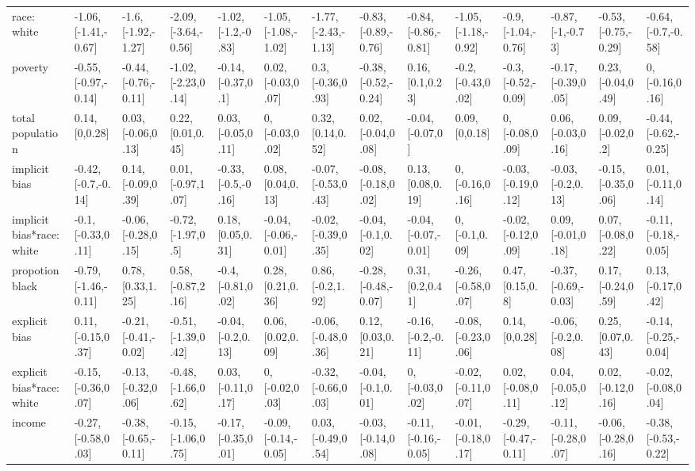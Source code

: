\documentclass[english,floatsintext,man]{apa6}
\newenvironment{lltable}
  {\begin{landscape}\begin{center}\begin{ThreePartTable}}
  {\end{ThreePartTable}\end{center}\end{landscape}}
\theoremstyle{definition}
\theoremstyle{definition}
\theoremstyle{remark}
\begin{document}
\begin{lltable}
{\begin{longtable}{llllllllllllll}
race: white & -1.06, [-1.41,-0.67] & -1.6, [-1.92,-1.27] & -2.09, [-3.64,-0.56] & -1.02, [-1.2,-0.83] & -1.05, [-1.08,-1.02] & -1.77, [-2.43,-1.13] & -0.83, [-0.89,-0.76] & -0.84, [-0.86,-0.81] & -1.05, [-1.18,-0.92] & -0.9, [-1.04,-0.76] & -0.87, [-1,-0.73] & -0.53, [-0.75,-0.29] & -0.64, [-0.7,-0.58]\\
poverty & -0.55, [-0.97,-0.14] & -0.44, [-0.76,-0.11] & -1.02, [-2.23,0.14] & -0.14, [-0.37,0.1] & 0.02, [-0.03,0.07] & 0.3, [-0.36,0.93] & -0.38, [-0.52,-0.24] & 0.16, [0.1,0.23] & -0.2, [-0.43,0.02] & -0.3, [-0.52,-0.09] & -0.17, [-0.39,0.05] & 0.23, [-0.04,0.49] & 0, [-0.16,0.16]\\
total population & 0.14, [0,0.28] & 0.03, [-0.06,0.13] & 0.22, [0.01,0.45] & 0.03, [-0.05,0.11] & 0, [-0.03,0.02] & 0.32, [0.14,0.52] & 0.02, [-0.04,0.08] & -0.04, [-0.07,0] & 0.09, [0,0.18] & 0, [-0.08,0.09] & 0.06, [-0.03,0.16] & 0.09, [-0.02,0.2] & -0.44, [-0.62,-0.25]\\
implicit bias & -0.42, [-0.7,-0.14] & 0.14, [-0.09,0.39] & 0.01, [-0.97,1.07] & -0.33, [-0.5,-0.16] & 0.08, [0.04,0.13] & -0.07, [-0.53,0.43] & -0.08, [-0.18,0.02] & 0.13, [0.08,0.19] & 0, [-0.16,0.16] & -0.03, [-0.19,0.12] & -0.03, [-0.2,0.13] & -0.15, [-0.35,0.06] & 0.01, [-0.11,0.14]\\
implicit bias*race: white & -0.1, [-0.33,0.11] & -0.06, [-0.28,0.15] & -0.72, [-1.97,0.5] & 0.18, [0.05,0.31] & -0.04, [-0.06,-0.01] & -0.02, [-0.39,0.35] & -0.04, [-0.1,0.02] & -0.04, [-0.07,-0.01] & 0, [-0.1,0.09] & -0.02, [-0.12,0.09] & 0.09, [-0.01,0.18] & 0.07, [-0.08,0.22] & -0.11, [-0.18,-0.05]\\
propotion black & -0.79, [-1.46,-0.11] & 0.78, [0.33,1.25] & 0.58, [-0.87,2.16] & -0.4, [-0.81,0.02] & 0.28, [0.21,0.36] & 0.86, [-0.2,1.92] & -0.28, [-0.48,-0.07] & 0.31, [0.2,0.41] & -0.26, [-0.58,0.07] & 0.47, [0.15,0.8] & -0.37, [-0.69,-0.03] & 0.17, [-0.24,0.59] & 0.13, [-0.17,0.42]\\
explicit bias & 0.11, [-0.15,0.37] & -0.21, [-0.41,-0.02] & -0.51, [-1.39,0.42] & -0.04, [-0.2,0.13] & 0.06, [0.02,0.09] & -0.06, [-0.48,0.36] & 0.12, [0.03,0.21] & -0.16, [-0.2,-0.11] & -0.08, [-0.23,0.06] & 0.14, [0,0.28] & -0.06, [-0.2,0.08] & 0.25, [0.07,0.43] & -0.14, [-0.25,-0.04]\\
explicit bias*race: white & -0.15, [-0.36,0.07] & -0.13, [-0.32,0.06] & -0.48, [-1.66,0.62] & 0.03, [-0.11,0.17] & 0, [-0.02,0.03] & -0.32, [-0.66,0.03] & -0.04, [-0.1,0.01] & 0, [-0.03,0.02] & -0.02, [-0.11,0.07] & 0.02, [-0.08,0.11] & 0.04, [-0.05,0.12] & 0.02, [-0.12,0.16] & -0.02, [-0.08,0.04]\\
income & -0.27, [-0.58,0.03] & -0.38, [-0.65,-0.11] & -0.15, [-1.06,0.75] & -0.17, [-0.35,0.01] & -0.09, [-0.14,-0.05] & 0.03, [-0.49,0.54] & -0.03, [-0.14,0.08] & -0.11, [-0.16,-0.05] & -0.01, [-0.18,0.17] & -0.29, [-0.47,-0.11] & -0.11, [-0.28,0.07] & -0.06, [-0.28,0.16] & -0.38, [-0.53,-0.22]\\
\bottomrule
\end{longtable}
}
\end{lltable}
\end{document}
